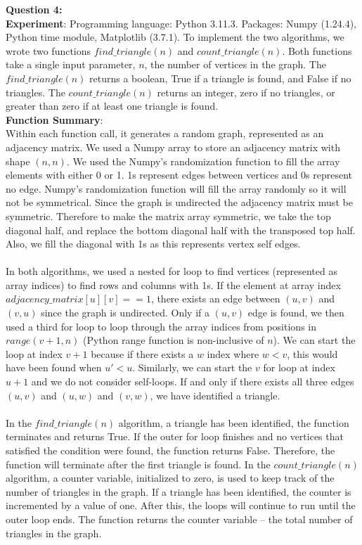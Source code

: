 \documentclass{article}
\begin{document}
    \textbf{Question 4:}\\
    \textbf{Experiment}:
    Programming language: Python 3.11.3. Packages: Numpy (1.24.4), Python time module, Matplotlib (3.7.1). To implement the two algorithms, we wrote two functions $find\_triangle(n)$ and $count\_triangle(n)$. Both functions take a single input parameter, $n$, the number of vertices in the graph. The $find\_triangle(n)$ returns a boolean, True if a triangle is found, and False if no triangles. The $count\_triangle(n)$ returns an integer, zero if no triangles, or greater than zero if at least one triangle is found.\\
    \textbf{Function Summary}: \\
    Within each function call, it generates a random graph, represented as an adjacency matrix. We used a Numpy array to store an adjacency matrix with shape $(n, n)$. We used the Numpy's randomization function to fill the array elements with either 0 or 1. 1s represent edges between vertices and 0s represent no edge. Numpy's randomization function will fill the array randomly so it will not be symmetrical. Since the graph is undirected the adjacency matrix must be symmetric. Therefore to make the matrix array symmetric, we take the top diagonal half, and replace the bottom diagonal half with the transposed top half. Also, we fill the diagonal with 1s as this represents vertex self edges. \\\\
    In both algorithms, we used a nested for loop to find vertices (represented as array indices) to find rows and columns with 1s. If the element at array index $adjacency\_matrix[u][v] == 1$, there exists an edge between $(u,v)$ and $(v,u)$ since the graph is undirected. Only if a $(u,v)$ edge is found, we then used a third for loop to loop through the array indices from positions in $range(v+1, n)$ (Python range function is non-inclusive of $n$). We can start the loop at index $v+1$ because if there exists a $w$ index where $w < v$, this would have been found when $u' < u$. Similarly, we can start the $v$ for loop at index $u+1$ and we do not consider self-loops. If and only if there exists all three edges $(u,v)$ and $(u,w)$ and $(v,w)$, we have identified a triangle.\\\\
    In the $find\_triangle(n)$ algorithm, a triangle has been identified, the function terminates and returns True. If the outer for loop finishes and no vertices that satisfied the condition were found, the function returns False. Therefore, the function will terminate after the first triangle is found. In the $count\_triangle(n)$ algorithm, a counter variable, initialized to zero, is used to keep track of the number of triangles in the graph. If a triangle has been identified, the counter is incremented by a value of one. After this, the loops will continue to run until the outer loop ends. The function returns the counter variable -- the total number of triangles in the graph. \\\\
\end{document}
